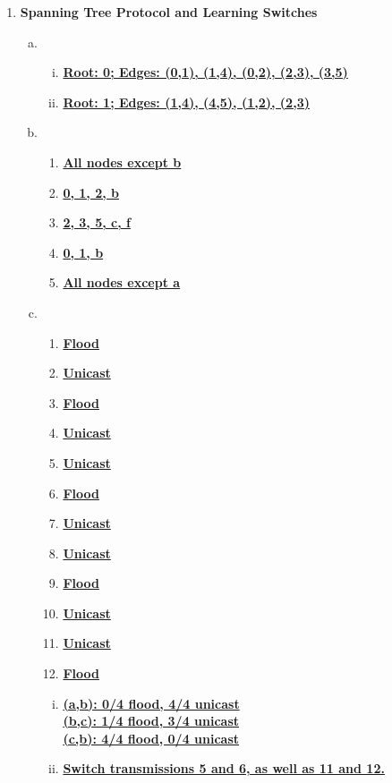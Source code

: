 \documentclass[11pt,fleqn]{article}
\begin{document}
\begin{enumerate}[Q1.]
\newpage
\item \textbf{Spanning Tree Protocol and Learning Switches}
\begin{enumerate}[(a)]
\item
\begin{enumerate}[i.]
\item \textbf{\underline{Root: 0; Edges: (0,1), (1,4), (0,2), (2,3), (3,5)}}
\item \textbf{\underline{Root: 1; Edges: (1,4), (4,5), (1,2), (2,3)}}
\end{enumerate}
\item
\begin{enumerate}[1.]
\item \textbf{\underline{All nodes except b}}
\item \textbf{\underline{0, 1, 2, b}}
\item \textbf{\underline{2, 3, 5, c, f}}
\item \textbf{\underline{0, 1, b}}
\item \textbf{\underline{All nodes except a}}
\end{enumerate}
\item
\begin{enumerate}[1.]
\item \textbf{\underline{Flood}}
\item \textbf{\underline{Unicast}}
\item \textbf{\underline{Flood}}
\item \textbf{\underline{Unicast}}
\item \textbf{\underline{Unicast}}
\item \textbf{\underline{Flood}}
\item \textbf{\underline{Unicast}}
\item \textbf{\underline{Unicast}}
\item \textbf{\underline{Flood}}
\item \textbf{\underline{Unicast}}
\item \textbf{\underline{Unicast}}
\item \textbf{\underline{Flood}}
\end{enumerate}
\begin{enumerate}[i.]
\item \textbf{\underline{(a,b): 0/4 flood, 4/4 unicast}} \\
\textbf{\underline{(b,c): 1/4 flood, 3/4 unicast}} \\
\textbf{\underline{(c,b): 4/4 flood, 0/4 unicast}}
\item \textbf{\underline{Switch transmissions 5 and 6, as well as 11 and 12.}}
\end{enumerate}
\end{enumerate}

\end{enumerate}
\end{document}
